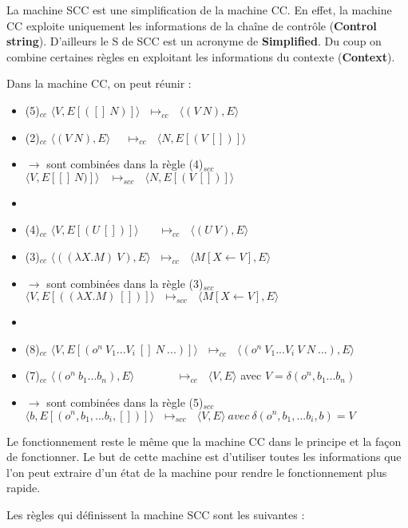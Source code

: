 \documentclass[10pt,a4paper]{report}
\begin{document}
	La machine SCC est une simplification de la machine CC. En effet, la machine CC exploite uniquement les informations de la chaîne de contrôle (\textbf{Control string}). D'ailleurs le S de SCC est un acronyme de \textbf{Simplified}. Du coup on combine certaines règles en exploitant les informations du contexte (\textbf{Context}).
	\bigbreak
	
	
	Dans la machine CC, on peut réunir :
	
	\begin{itemize}
		\item[] (5)$_{cc}$ $\langle V,E[([]~N)]\rangle~~~\longmapsto_{cc}~~~\langle(V~N),E\rangle$
		\item[] (2)$_{cc}$ $\langle(V~N),E\rangle~~~~~~\longmapsto_{cc}~~~\langle N,E[(V~[])]\rangle$
		\item[] $\rightarrow$ sont combinées dans la règle (4)$_{scc}$ $ \langle V,E[[]~N)]\rangle~~~~\longmapsto_{scc}~~~\langle N,E[(V~[])]\rangle$
		\item[]
		\item[] (4)$_{cc}$ $\langle V,E[(U~[])]\rangle~~~~~~~~\longmapsto_{cc}~~~\langle(U~V),E\rangle$
		\item[]	(3)$_{cc}$ $\langle((\lambda X.M)~V),E\rangle~~~\longmapsto_{cc}~~~\langle M[X\longleftarrow V],E\rangle$
		\item[] $\rightarrow$ sont combinées dans la règle (3)$_{scc}$ $\langle V,E[((\lambda X.M)~[])]\rangle ~~~\longmapsto_{scc}~~~\langle M[X\leftarrow V],E\rangle$
		\item[]
		\item[] (8)$_{cc}$ $\langle V,E[(o^{n}~V_{1}...V_{i}~[]~N~...)]\rangle~~~\longmapsto_{cc}~~~ \langle(o^{n}~V_{1}...V_{i}~V~N ~...),E\rangle$ 
		\item[] (7)$_{cc}$ $\langle(o^{n}~b_{1}...b_{n}),E\rangle~~~~~~~~~~~~~~~~~\longmapsto_{cc}~~~\langle V,E\rangle$ avec $V = \delta(o^{n},b_{1}...b_{n})$ 
		\item[] $\rightarrow$ sont combinées dans la règle (5)$_{scc}$ $\langle b,E[(o^{n},b_{1},...b_{i},[])]\rangle ~~~\longmapsto_{scc}~~~\langle V,E\rangle~avec~\delta
		(o^{n},b_{1},...b_{i},b)=V$
	\end{itemize}
	\medbreak
	
	Le fonctionnement reste le même que la machine CC dans le principe et la façon de fonctionner. Le but de cette machine est d'utiliser toutes les informations que l'on peut extraire d'un état de la machine pour rendre le fonctionnement plus rapide.
	\bigbreak
	
	
	Les règles qui définissent la machine SCC sont les suivantes :
	
\end{document}
